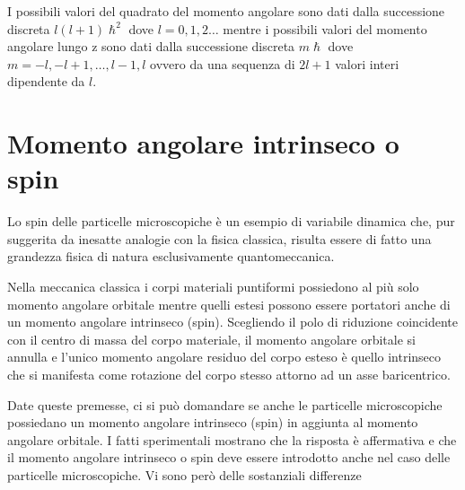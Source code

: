 I possibili valori del quadrato del momento angolare sono dati dalla
successione discreta \(l(l+1) \hslash^{2}\) dove \(l=0,1,2 \dots\)
mentre i possibili valori del momento angolare lungo z sono dati dalla
successione discreta \(m \hslash\) dove
\(m = -l, -l + 1, \dots, l-1, l\) ovvero da una sequenza di \(2l+1\)
valori interi dipendente da \(l\).

\section{Momento angolare intrinseco o spin}\label{sec:momento-angolare-intrinseco-o-spin}

Lo spin delle particelle microscopiche è un esempio di variabile dinamica che, pur suggerita da inesatte analogie con
la fisica classica, risulta essere di fatto una grandezza fisica di natura esclusivamente quantomeccanica.

Nella meccanica classica i corpi materiali puntiformi possiedono al più
solo momento angolare orbitale mentre quelli estesi possono essere
portatori anche di un momento angolare intrinseco (spin).
Scegliendo il
polo di riduzione coincidente con il centro di massa del corpo
materiale, il momento angolare orbitale si annulla e l'unico momento
angolare residuo del corpo esteso è quello intrinseco che si manifesta
come rotazione del corpo stesso attorno ad un asse baricentrico.

Date queste premesse, ci si può domandare se anche le particelle
microscopiche possiedano un momento angolare intrinseco (spin) in
aggiunta al momento angolare orbitale.
I fatti sperimentali mostrano che
la risposta è affermativa e che il momento angolare intrinseco o spin
deve essere introdotto anche nel caso delle particelle microscopiche.
Vi
sono però delle sostanziali differenze

